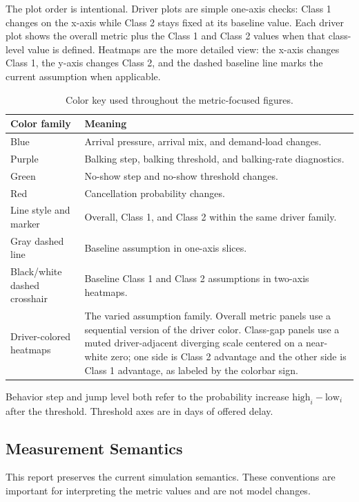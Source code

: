 \documentclass[11pt]{article}
\begin{document}
The plot order is intentional. Driver plots are simple one-axis checks: Class 1 changes on the x-axis while Class 2 stays fixed at its baseline value. Each driver plot shows the overall metric plus the Class 1 and Class 2 values when that class-level value is defined. Heatmaps are the more detailed view: the x-axis changes Class 1, the y-axis changes Class 2, and the dashed baseline line marks the current assumption when applicable.

\begin{table}[H]
\centering
\renewcommand{\arraystretch}{1.12}
\begin{tabular}{p{}p{}}
\toprule
Color family & Meaning \\
\midrule
Blue & Arrival pressure, arrival mix, and demand-load changes. \\
Purple & Balking step, balking threshold, and balking-rate diagnostics. \\
Green & No-show step and no-show threshold changes. \\
Red & Cancellation probability changes. \\
Line style and marker & Overall, Class 1, and Class 2 within the same driver family. \\
Gray dashed line & Baseline assumption in one-axis slices. \\
Black/white dashed crosshair & Baseline Class 1 and Class 2 assumptions in two-axis heatmaps. \\
Driver-colored heatmaps & The varied assumption family. Overall metric panels use a sequential version of the driver color. Class-gap panels use a muted driver-adjacent diverging scale centered on a near-white zero; one side is Class 2 advantage and the other side is Class 1 advantage, as labeled by the colorbar sign. \\
\bottomrule
\end{tabular}
\caption{Color key used throughout the metric-focused figures.}
\end{table}

Behavior step and jump level both refer to the probability increase
$\text{high}_i - \text{low}_i$ after the threshold. Threshold axes are in days of
offered delay.

\subsection{Measurement Semantics}

This report preserves the current simulation semantics. These conventions are
important for interpreting the metric values and are not model changes.
\end{document}
